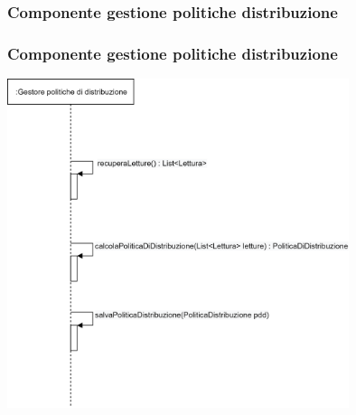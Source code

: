\documentclass{beamer}
\begin{document}
\begin{frame}
	\subsubsection{Componente gestione politiche distribuzione}
	\frametitle{Componente gestione politiche distribuzione}
	\begin{center}
		\includegraphics[width=0.75\textwidth, height=0.75\textheight, keepaspectratio=true]{gestione_pol_distr.png}
	\end{center}
\end{frame}
\end{document}
